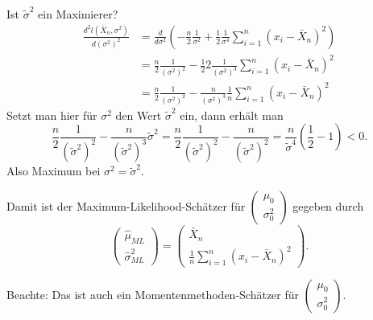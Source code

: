 \documentclass{tstextbook}
\begin{document}
\begin{example}
	Ist $ \tilde{\sigma}^2 $ ein Maximierer?
	\[
	\begin{aligned}
		\frac{d^2l\left(\bar{X}_n,\sigma^2\right)}{d\left(\sigma^2\right)^2} & = \frac{d}{d\sigma^2}\left(-\frac{n}{2}\frac{1}{\sigma^2}+\frac{1}{2}\frac{1}{\sigma^4}\sum_{i=1}^{n}(x_i-\bar{X}_n)^2\right) \\
		& = \frac{n}{2}\frac{1}{\left(\sigma^2\right)^2}-\frac{1}{2}2\frac{1}{\left(\sigma^2\right)^3}\sum_{i=1}^{n}(x_i-\bar{X}_n)^2 \\
		& = \frac{n}{2}\frac{1}{\left(\sigma^2\right)^2}-\frac{n}{\left(\sigma^2\right)^3}\frac{1}{n}\sum_{i=1}^{n}(x_i-\bar{X}_n)^2
	\end{aligned}
	\]
	Setzt man hier für $ \sigma^2 $ den Wert $ \tilde{\sigma}^2 $ ein, dann erhält man 
	\[
	\frac{n}{2}\frac{1}{\left(\tilde{\sigma}^2\right)^2}-\frac{n}{\left(\tilde{\sigma}^2\right)^3}\tilde{\sigma}^2 = \frac{n}{2}\frac{1}{\left(\tilde{\sigma}^2\right)^2}-\frac{n}{\left(\tilde{\sigma}^2\right)^2} = \frac{n}{\tilde{\sigma}^4}\left(\frac{1}{2}-1\right) < 0.
	\]
	Also Maximum bei $ \sigma^2 = \tilde{\sigma}^2 $.
	
	Damit ist der Maximum-Likelihood-Schätzer für $ \begin{pmatrix}
		\mu_0 \\ \sigma_0^2
	\end{pmatrix} $ gegeben durch 
	\[
	\begin{pmatrix}
		\hat{\mu}_{ML} \\ \hat{\sigma}_{ML}^2
	\end{pmatrix} = \begin{pmatrix}
	\bar{X}_n \\ \frac{1}{n} \sum_{i=1}^{n}(x_i-\bar{X}_n)^2
\end{pmatrix}.
	\]
	
	Beachte: Das ist auch ein Momentenmethoden-Schätzer für $ \begin{pmatrix}
		\mu_0 \\ \sigma_0^2
	\end{pmatrix} $.
\end{example}
\end{document}
